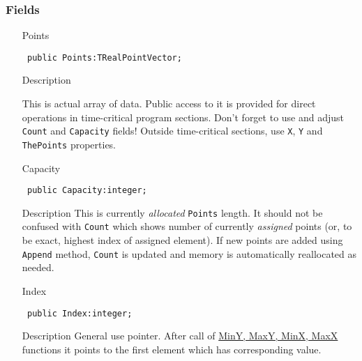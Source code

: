 \documentclass[12pt,a4paper,oneside]{report}
\newcommand{\declarationitem}[1]{{\addfontfeatures{FakeBold=1.3} #1}}
\newcommand{\descriptiontitle}[1]{{\addfontfeatures{FakeSlant}#1}}
\newcommand{\code}[1]{\texttt{#1}}
\begin{document}
\subsubsection{Fields}
\begin{itemize}
	\label{lmPointsVec.TPoints-Points}
	\item[\declarationitem{Points}\hfill]
	\begin{flushleft}
		\code{
			public Points:TRealPointVector;}
	\end{flushleft}
\item[\descriptiontitle{Description}]

This is actual array of data. Public access to it is provided for direct operations in time-critical program sections. Don't forget to use and adjust \code{Count} and \code{Capacity} fields! Outside time-critical sections, use \code{X}, \code{Y} and \code{ThePoints} properties.
	
\par  \label{lmPointsVec.TPoints-Capacity}
	\item[\declarationitem{Capacity}\hfill]
	\begin{flushleft}
		\code{
			public Capacity:integer;}
	\end{flushleft}
	\item[\descriptiontitle{Description}]	
	This is currently \emph{allocated} \code{Points} length. It should not be confused with \code{Count} which shows number of currently \emph{assigned} points (or, to be exact, highest index of assigned element). If new points are added using \code{Append} method, \code{Count} is updated and memory is automatically reallocated as needed.
	  
	\par  \label{lmPointsVec.TPoints-Index}
	\item[\declarationitem{Index}\hfill]
	\begin{flushleft}
		\code{
			public Index:integer;}
	\end{flushleft}
	\item[\descriptiontitle{Description}]	
	General use pointer. After call of \hyperref[lmPointsVec.TPoints-MinX]{MinY, MaxY, MinX, MaxX} functions it points to the first element which has corresponding value.
	\par  \end{itemize}
	\par  \label{lmPointsVec.TPoints-Count}
\end{document}
